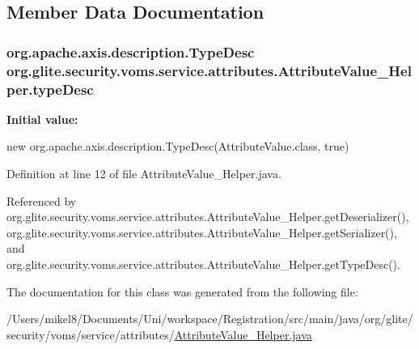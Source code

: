 \subsection{Member Data Documentation}
\hypertarget{classorg_1_1glite_1_1security_1_1voms_1_1service_1_1attributes_1_1AttributeValue__Helper_a03972bb93f35dd2eb4a562d9ee45fe30}{
\subsubsection[{typeDesc}]{\setlength{\rightskip}{0pt plus 5cm}org.apache.axis.description.TypeDesc {\bf org.glite.security.voms.service.attributes.AttributeValue\_\-Helper.typeDesc}}}
\label{classorg_1_1glite_1_1security_1_1voms_1_1service_1_1attributes_1_1AttributeValue__Helper_a03972bb93f35dd2eb4a562d9ee45fe30}
{\bfseries Initial value:}
\begin{DoxyCode}

        new org.apache.axis.description.TypeDesc(AttributeValue.class, true)
\end{DoxyCode}


Definition at line 12 of file AttributeValue\_\-Helper.java.



Referenced by org.glite.security.voms.service.attributes.AttributeValue\_\-Helper.getDeserializer(), org.glite.security.voms.service.attributes.AttributeValue\_\-Helper.getSerializer(), and org.glite.security.voms.service.attributes.AttributeValue\_\-Helper.getTypeDesc().



The documentation for this class was generated from the following file:\begin{DoxyCompactItemize}
\item 
/Users/mikel8/Documents/Uni/workspace/Registration/src/main/java/org/glite/security/voms/service/attributes/\hyperlink{AttributeValue__Helper_8java}{AttributeValue\_\-Helper.java}\end{DoxyCompactItemize}
